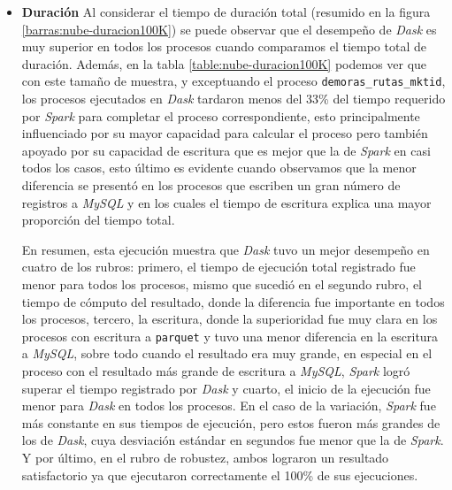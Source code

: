 \begin{itemize}
	\item \textbf{Duración} Al considerar el tiempo de duración total (resumido en la figura \ref{barras:nube-duracion100K}) se puede observar que el desempeño de \textit{Dask} es muy superior en todos los procesos cuando comparamos el tiempo total de duración. Además, en la tabla \ref{table:nube-duracion100K} podemos ver que con este tamaño de muestra, y exceptuando el proceso \texttt{demoras\_rutas\_mktid}, los procesos ejecutados en \textit{Dask} tardaron menos del 33\% del tiempo requerido por \textit{Spark} para completar el proceso correspondiente, esto principalmente influenciado por su mayor capacidad para calcular el proceso pero también apoyado por su capacidad de escritura que es mejor que la de \textit{Spark} en casi todos los casos, esto último es evidente cuando observamos que la menor diferencia se presentó en los procesos que escriben un gran número de registros a \textit{MySQL} y en los cuales el tiempo de escritura explica una mayor proporción del tiempo total.
	
En resumen, esta ejecución muestra que \textit{Dask} tuvo un mejor desempeño en cuatro de los rubros: primero, el tiempo de ejecución total registrado fue menor para todos los procesos, mismo que sucedió en el segundo rubro, el tiempo de cómputo del resultado, donde la diferencia fue importante en todos los procesos, tercero, la escritura, donde la superioridad fue muy clara en los procesos con escritura a \texttt{parquet} y tuvo una menor diferencia en la escritura a \textit{MySQL}, sobre todo cuando el resultado era muy grande, en especial en el proceso con el resultado más grande de escritura a \textit{MySQL}, \textit{Spark} logró superar el tiempo registrado por \textit{Dask} y cuarto, el inicio de la ejecución fue menor para \textit{Dask} en todos los procesos. En el caso de la variación, \textit{Spark} fue más constante en sus tiempos de ejecución, pero estos fueron más grandes de los de \textit{Dask}, cuya desviación estándar en segundos fue menor que la de \textit{Spark}. Y por último, en el rubro de robustez, ambos lograron un resultado satisfactorio ya que ejecutaron correctamente el 100\% de sus ejecuciones.
	
\end{itemize}


